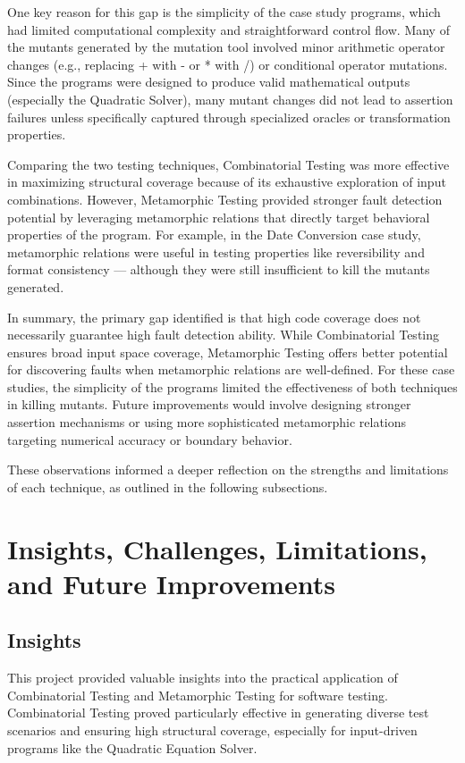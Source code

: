 \documentclass[conference]{IEEEtran}
\begin{document}
One key reason for this gap is the simplicity of the case study programs, which had limited computational complexity and straightforward control flow. Many of the mutants generated by the mutation tool involved minor arithmetic operator changes (e.g., replacing + with - or * with /) or conditional operator mutations. Since the programs were designed to produce valid mathematical outputs (especially the Quadratic Solver), many mutant changes did not lead to assertion failures unless specifically captured through specialized oracles or transformation properties.

Comparing the two testing techniques, Combinatorial Testing was more effective in maximizing structural coverage because of its exhaustive exploration of input combinations. However, Metamorphic Testing provided stronger fault detection potential by leveraging metamorphic relations that directly target behavioral properties of the program. For example, in the Date Conversion case study, metamorphic relations were useful in testing properties like reversibility and format consistency --- although they were still insufficient to kill the mutants generated.

In summary, the primary gap identified is that high code coverage does not necessarily guarantee high fault detection ability. While Combinatorial Testing ensures broad input space coverage, Metamorphic Testing offers better potential for discovering faults when metamorphic relations are well-defined. For these case studies, the simplicity of the programs limited the effectiveness of both techniques in killing mutants. Future improvements would involve designing stronger assertion mechanisms or using more sophisticated metamorphic relations targeting numerical accuracy or boundary behavior.

These observations informed a deeper reflection on the strengths and limitations of each technique, as outlined in the following subsections.

\section{Insights, Challenges, Limitations, and Future Improvements}

\subsection{Insights}
This project provided valuable insights into the practical application of Combinatorial Testing and Metamorphic Testing for software testing. Combinatorial Testing proved particularly effective in generating diverse test scenarios and ensuring high structural coverage, especially for input-driven programs like the Quadratic Equation Solver.
\end{document}
